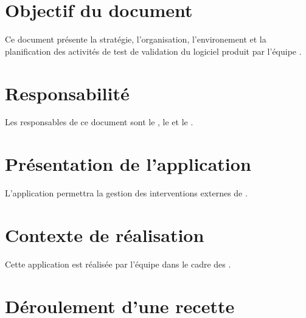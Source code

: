 \section{Objectif du document}
	Ce document présente la stratégie, l'organisation, l'environement et la planification des activités de test de validation du logiciel produit par l'équipe \nomClient.
	
\section{Responsabilité}
	Les responsables de ce document sont le \CP, le \RQ{} et le \RD.
	
\section{Présentation de l'application}
	L'application permettra la gestion des interventions externes de \nomClient.
	
\section{Contexte de réalisation}
	Cette application est réalisée par l'équipe \nomEquipe{} dans le cadre des \PIC.

\section{Déroulement d'une recette}


